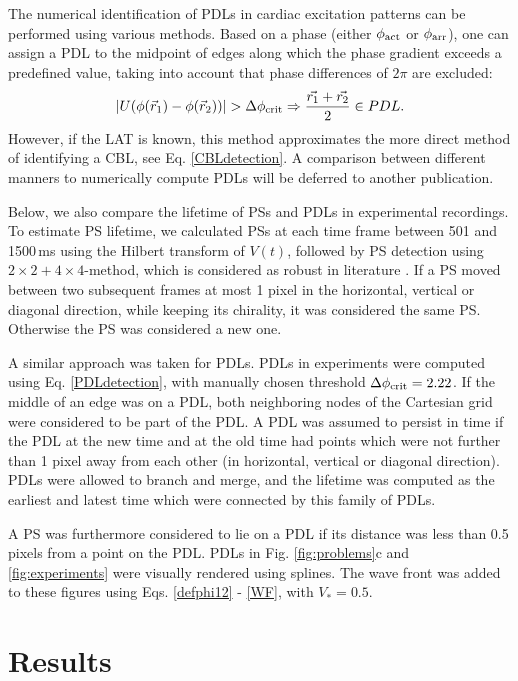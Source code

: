 \documentclass[aps,pre,amsfonts,amssymb,amsmath,twocolumn, superscriptaddress]{revtex4-1}
\newcommand{\phiact}{\ensuremath{\phi_{\rm act}}}
\newcommand{\phiarr}{\ensuremath{\phi_{\rm arr}}}
\newcommand{\VS}{V_*}
\begin{document}
The numerical identification of PDLs in cardiac excitation patterns can be performed using various methods. Based on a phase (either $\phiact$ or $\phiarr$), one can assign a PDL to the midpoint of edges along which the phase gradient exceeds a predefined value, taking into account that phase differences of $2\pi$ are excluded: 
\begin{align}
| U( \phi(\vec{r}_1) - \phi(\vec{r}_2)) | > \Delta\phi_{\rm crit}     \Rightarrow \frac{\vec{r_1} + \vec{r_2}}{2} \in PDL.  \label{PDLdetection}
\end{align}
However, if the LAT is known, this method approximates the more direct method of identifying a CBL, see Eq. \eqref{CBLdetection}. A comparison between different manners to numerically compute PDLs will be deferred to another publication. 

Below, we also compare the lifetime of PSs and PDLs in experimental recordings. To estimate PS lifetime, we calculated PSs at each time frame between 501 and 1500\,ms using the Hilbert transform of $V(t)$, followed by PS detection using $2\times2+4\times4$-method, which is considered as robust in literature \citep{Kuklik:2017}. If a PS moved between two subsequent frames at most 1 pixel in the horizontal, vertical or diagonal direction, while keeping its chirality, it was considered the same PS. Otherwise the PS was considered a new one. 

A similar approach was taken for PDLs. PDLs in experiments were computed using Eq. \eqref{PDLdetection}, with manually chosen threshold $\Delta\phi_{\rm crit} = 2.22$. If the middle of an edge was on a PDL, both neighboring nodes of the Cartesian grid were considered to be part of the PDL. A PDL was assumed to persist in time if the PDL at the new time and at the old time had points which were not further than 1 pixel away from each other (in horizontal, vertical or diagonal direction). PDLs were allowed to branch and merge, and the lifetime was computed as the earliest and latest time which were connected by this family of PDLs. 

A PS was furthermore considered to lie on a PDL if its distance was less than 0.5 pixels from a point on the PDL. PDLs in Fig. \ref{fig:problems}c and \ref{fig:experiments} were visually rendered using splines. The wave front was added to these figures using Eqs. \eqref{defphi12} - \eqref{WF}, with $\VS = 0.5$.

\section{Results}\label{sec:results}
\end{document}

